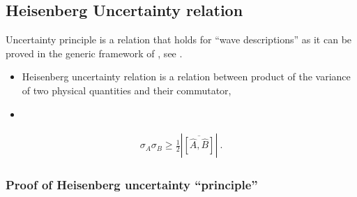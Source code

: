 \documentclass[letterpaper,10pt,english]{jupyterBook}
\begin{document}
\subsection{Heisenberg Uncertainty relation}
\label{\detokenize{ch/quantum-mechanics/intro:heisenberg-uncertainty-relation}}\label{\detokenize{ch/quantum-mechanics/intro:quantum-mechanics-heisenber-uncertainty-relation}}
\sphinxAtStartPar
Uncertainty principle is a relation that holds for “wave descriptions” as it can be proved in the generic framework of , see .
\begin{itemize}
\item {} 
\sphinxAtStartPar
Heisenberg uncertainty relation is a relation between product of the variance of two physical quantities and their commutator,

\item {} 
\sphinxAtStartPar
{} 

\end{itemize}
\begin{equation*}
\begin{split}\sigma_A \sigma_B \ge \frac{1}{2} \left|\overline{[\hat{A}, \hat{B}]}\right| \ .\end{split}
\end{equation*}\subsubsection*{Proof of Heisenberg uncertainty “principle”}
\end{document}
